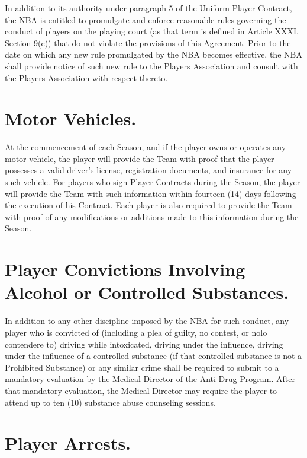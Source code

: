 \documentclass[
]{book}
\begin{document}
In addition to its authority under paragraph 5 of the Uniform Player Contract, the NBA is entitled to promulgate and enforce reasonable rules governing the conduct of players on the playing court (as that term is defined in Article XXXI, Section 9(c)) that do not violate the provisions of this Agreement. Prior to the date on which any new rule promulgated by the NBA becomes effective, the NBA shall provide notice of such new rule to the Players Association and consult with the Players Association with respect thereto.

\hypertarget{motor-vehicles.}{%
\section{Motor Vehicles.}\label{motor-vehicles.}}

At the commencement of each Season, and if the player owns or operates any motor vehicle, the player will provide the Team with proof that the player possesses a valid driver's license, registration documents, and insurance for any such vehicle. For players who sign Player Contracts during the Season, the player will provide the Team with such information within fourteen (14) days following the execution of his Contract. Each player is also required to provide the Team with proof of any modifications or additions made to this information during the Season.

\hypertarget{player-convictions-involving-alcohol-or-controlled-substances.}{%
\section{Player Convictions Involving Alcohol or Controlled Substances.}\label{player-convictions-involving-alcohol-or-controlled-substances.}}

In addition to any other discipline imposed by the NBA for such conduct, any player who is convicted of (including a plea of guilty, no contest, or nolo contendere to) driving while intoxicated, driving under the influence, driving under the influence of a controlled substance (if that controlled substance is not a Prohibited Substance) or any similar crime shall be required to submit to a mandatory evaluation by the Medical Director of the Anti-Drug Program. After that mandatory evaluation, the Medical Director may require the player to attend up to ten (10) substance abuse counseling sessions.

\hypertarget{player-arrests.}{%
\section{Player Arrests.}\label{player-arrests.}}
\end{document}
